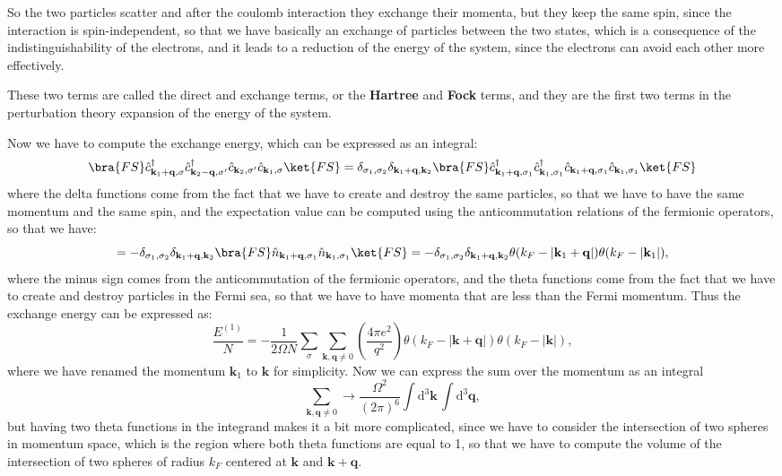 So the two particles scatter and after the coulomb interaction they exchange their momenta, but they keep the same spin, since the interaction is spin-independent, so that we have basically an exchange of particles between the two states, which is a consequence of the indistinguishability of the electrons, and it leads to a reduction of the energy of the system, since the electrons can avoid each other more effectively.

These two terms are called the direct and exchange terms, or the \textbf{Hartree} and \textbf{Fock} terms, and they are the first two terms in the perturbation theory expansion of the energy of the system.


Now we have to compute the exchange energy, which can be expressed as an integral:
\[
    \bra{FS} \hat{c}_{\mathbf{k}_1 + \mathbf{q}, \sigma}^\dagger \hat{c}_{\mathbf{k}_2 - \mathbf{q}, \sigma'}^\dagger \hat{c}_{\mathbf{k}_2, \sigma'} \hat{c}_{\mathbf{k}_1, \sigma} \ket{FS} = \delta_{\sigma_1, \sigma_2} \delta_{\mathbf{k}_1 + \mathbf{q}, \mathbf{k}_2} \bra{FS} \hat{c}_{\mathbf{k}_1 + \mathbf{q}, \sigma_1}^\dagger \hat{c}_{\mathbf{k}_1, \sigma_1}^{\dagger} \hat{c}_{\mathbf{k}_1 + \mathbf{q}, \sigma_1} \hat{c}_{\mathbf{k}_1, \sigma_1} \ket{FS}
\]
where the delta functions come from the fact that we have to create and destroy the same particles, so that we have to have the same momentum and the same spin, and the expectation value can be computed using the anticommutation relations of the fermionic operators, so that we have:
\[
    = - \delta_{\sigma_1, \sigma_2} \delta_{\mathbf{k}_1 + \mathbf{q}, \mathbf{k}_2} \bra{FS} \hat{n}_{\mathbf{k}_1 + \mathbf{q}, \sigma_1} \hat{n}_{\mathbf{k}_1, \sigma_1} \ket{FS} = - \delta_{\sigma_1, \sigma_2} \delta_{\mathbf{k}_1 + \mathbf{q}, \mathbf{k}_2} \theta(k_F - |\mathbf{k}_1 + \mathbf{q}|) \theta(k_F - |\mathbf{k}_1|),
\]
where the minus sign comes from the anticommutation of the fermionic operators, and the theta functions come from the fact that we have to create and destroy particles in the Fermi sea, so that we have to have momenta that are less than the Fermi momentum. Thus the exchange energy can be expressed as:
\[
    \frac{E^{(1)}}{N} = -\frac{1}{2\Omega N} \sum_{\sigma} \sum_{\mathbf{k}, \mathbf{q} \neq 0} \left( \frac{4 \pi e^2}{q^2} \right) \theta(k_F - |\mathbf{k} + \mathbf{q}|) \theta(k_F - |\mathbf{k}|),
\]
where we have renamed the momentum \(\mathbf{k}_1\) to \(\mathbf{k}\) for simplicity. Now we can express the sum over the momentum as an integral
\[
    \sum_{\mathbf{k}, \mathbf{q} \neq 0} \to \frac{\Omega^2}{(2\pi)^6} \int \mathrm{d}^3 \mathbf{k} \, \int \mathrm{d}^3 \mathbf{q},
\]
but having two theta functions in the integrand makes it a bit more complicated, since we have to consider the intersection of two spheres in momentum space, which is the region where both theta functions are equal to 1, so that we have to compute the volume of the intersection of two spheres of radius \(k_F\) centered at \(\mathbf{k}\) and \(\mathbf{k} + \mathbf{q}\).

